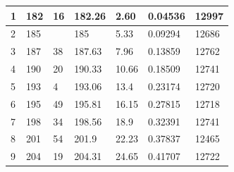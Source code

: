 \documentclass[a4paper, 11pt]{article}
\begin{document}
\begin{center}
\begin{tabular}{|l|l|l|l|l|l|l|}
		1    & 182                           & 16                     & 182.26                        & 2.60                     & 0.04536                & 12997    \\ \hline
		2    & 185                           & ~                      & 185                           & 5.33                     & 0.09294                & 12686    \\ \hline
		3    & 187                           & 38                     & 187.63                        & 7.96                     & 0.13859                & 12762    \\ \hline
		4    & 190                           & 20                     & 190.33                        & 10.66                    & 0.18509                & 12741    \\ \hline
		5    & 193                           & 4                      & 193.06                        & 13.4                     & 0.23174                & 12720    \\ \hline
		6    & 195                           & 49                     & 195.81                        & 16.15                    & 0.27815                & 12718    \\ \hline
		7    & 198                           & 34                     & 198.56                        & 18.9                     & 0.32391                & 12741    \\ \hline
		8    & 201                           & 54                     & 201.9                         & 22.23                    & 0.37837                & 12465    \\ \hline
		9    & 204                           & 19                     & 204.31                        & 24.65                    & 0.41707                & 12722    \\ \hline
	\end{tabular}
\end{center}
\end{document}
